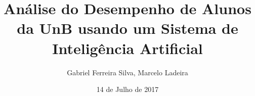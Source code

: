 \documentclass{beamer}
\title{Análise do Desempenho de Alunos da UnB usando um Sistema de Inteligência
Artificial}
\author{Gabriel Ferreira Silva\inst{1}, Marcelo Ladeira\inst{1}}
\institute[Universidade de Brasília] %
{
  \inst{1}%
  Departamento de Ciência da Computação \\
  Universidade de Brasília
}
\date{14 de Julho de 2017}
\begin{document}
\begin{frame}
  \titlepage
\end{frame}





\end{document}
